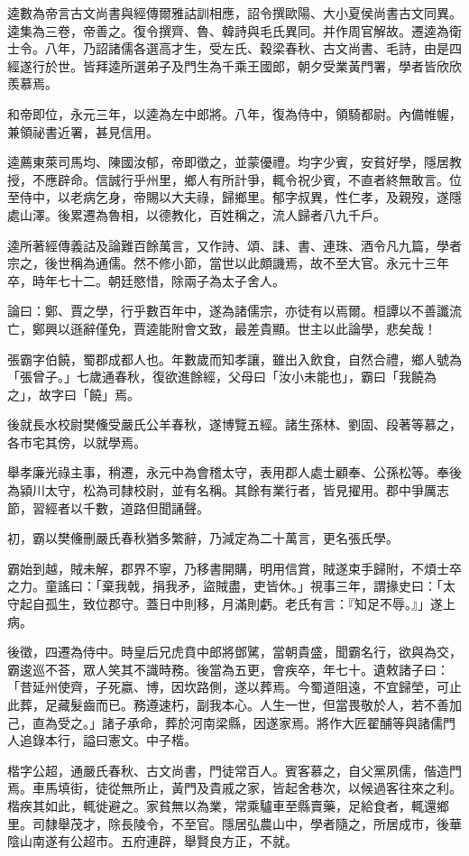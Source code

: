 \begin{pinyinscope}
逵數為帝言古文尚書與經傳爾雅詁訓相應，詔令撰歐陽、大小夏侯尚書古文同異。逵集為三卷，帝善之。復令撰齊、魯、韓詩與毛氏異同。并作周官解故。遷逵為衛士令。八年，乃詔諸儒各選高才生，受左氏、穀梁春秋、古文尚書、毛詩，由是四經遂行於世。皆拜逵所選弟子及門生為千乘王國郎，朝夕受業黃門署，學者皆欣欣羨慕焉。

和帝即位，永元三年，以逵為左中郎將。八年，復為侍中，領騎都尉。內備帷幄，兼領祕書近署，甚見信用。

逵薦東萊司馬均、陳國汝郁，帝即徵之，並蒙優禮。均字少賓，安貧好學，隱居教授，不應辟命。信誠行乎州里，鄉人有所計爭，輒令祝少賓，不直者終無敢言。位至侍中，以老病乞身，帝賜以大夫祿，歸鄉里。郁字叔異，性仁孝，及親歿，遂隱處山澤。後累遷為魯相，以德教化，百姓稱之，流人歸者八九千戶。

逵所著經傳義詁及論難百餘萬言，又作詩、頌、誄、書、連珠、酒令凡九篇，學者宗之，後世稱為通儒。然不修小節，當世以此頗譏焉，故不至大官。永元十三年卒，時年七十二。朝廷愍惜，除兩子為太子舍人。

論曰：鄭、賈之學，行乎數百年中，遂為諸儒宗，亦徒有以焉爾。桓譚以不善讖流亡，鄭興以遜辭僅免，賈逵能附會文致，最差貴顯。世主以此論學，悲矣哉！

張霸字伯饒，蜀郡成都人也。年數歲而知孝讓，雖出入飲食，自然合禮，鄉人號為「張曾子。」七歲通春秋，復欲進餘經，父母曰「汝小未能也」，霸曰「我饒為之」，故字曰「饒」焉。

後就長水校尉樊儵受嚴氏公羊春秋，遂博覽五經。諸生孫林、劉固、段著等慕之，各市宅其傍，以就學焉。

舉孝廉光祿主事，稍遷，永元中為會稽太守，表用郡人處士顧奉、公孫松等。奉後為潁川太守，松為司隸校尉，並有名稱。其餘有業行者，皆見擢用。郡中爭厲志節，習經者以千數，道路但聞誦聲。

初，霸以樊儵刪嚴氏春秋猶多繁辭，乃減定為二十萬言，更名張氏學。

霸始到越，賊未解，郡界不寧，乃移書開購，明用信賞，賊遂束手歸附，不煩士卒之力。童謠曰：「棄我戟，捐我矛，盜賊盡，吏皆休。」視事三年，謂掾史曰：「太守起自孤生，致位郡守。蓋日中則移，月滿則虧。老氏有言：『知足不辱。』」遂上病。

後徵，四遷為侍中。時皇后兄虎賁中郎將鄧騭，當朝貴盛，聞霸名行，欲與為交，霸逡巡不荅，眾人笑其不識時務。後當為五更，會疾卒，年七十。遺敕諸子曰：「昔延州使齊，子死嬴、博，因坎路側，遂以葬焉。今蜀道阻遠，不宜歸塋，可止此葬，足藏髮齒而已。務遵速朽，副我本心。人生一世，但當畏敬於人，若不善加己，直為受之。」諸子承命，葬於河南梁縣，因遂家焉。將作大匠翟酺等與諸儒門人追錄本行，謚曰憲文。中子楷。

楷字公超，通嚴氏春秋、古文尚書，門徒常百人。賓客慕之，自父黨夙儒，偕造門焉。車馬填街，徒從無所止，黃門及貴戚之家，皆起舍巷次，以候過客往來之利。楷疾其如此，輒徙避之。家貧無以為業，常乘驢車至縣賣藥，足給食者，輒還鄉里。司隸舉茂才，除長陵令，不至官。隱居弘農山中，學者隨之，所居成市，後華陰山南遂有公超市。五府連辟，舉賢良方正，不就。


\end{pinyinscope}
